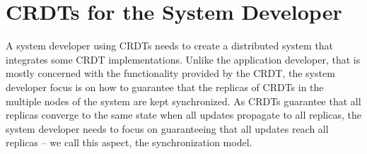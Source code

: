 \documentclass[11pt,a4paper]{article}
\begin{document}
%
%
%
%
%
%
%
%


\section{CRDTs for the System Developer}\label{sec:sysdev}

A system developer using CRDTs needs to create a distributed system that integrates 
some CRDT implementations. Unlike the application developer, that is mostly concerned with the
functionality provided by the CRDT, the system developer focus is on how to guarantee
that the replicas of CRDTs in the multiple nodes of the system are kept synchronized.
As CRDTs guarantee that all replicas converge to the same state when all updates
propagate to all replicas, the system developer needs to focus on guaranteeing that
all updates reach all replicas -- we call this aspect, the synchronization model. 
\end{document}
